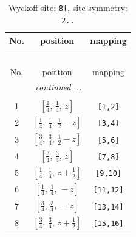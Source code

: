 \documentclass[fleqn,8pt]{jsarticle}
\begin{document}
\begin{longtable}{ccc}
\caption{Wyckoff site: {\tt 8f}, site symmetry: {\tt 2..}}
 \\
 \hline \hline
No. & position & mapping \\ \hline \endfirsthead

\multicolumn{2}{l}{\tablename\ \thetable{}} \\
 \hline \hline
No. & position & mapping \\ \hline \endhead

 \hline \hline
\multicolumn{2}{r}{\footnotesize\it continued ...} \\ \endfoot

 \hline \hline
\multicolumn{2}{r}{} \\ \endlastfoot

1 & $\left[ \frac{1}{4},\, \frac{1}{4},\, z \right]$ & {\tt [1,2]} \\ \hline
2 & $\left[ \frac{1}{4},\, \frac{1}{4},\, \frac{1}{2} - z \right]$ & {\tt [3,4]} \\ \hline
3 & $\left[ \frac{3}{4},\, \frac{3}{4},\, \frac{1}{2} - z \right]$ & {\tt [5,6]} \\ \hline
4 & $\left[ \frac{3}{4},\, \frac{3}{4},\, z \right]$ & {\tt [7,8]} \\ \hline
5 & $\left[ \frac{1}{4},\, \frac{1}{4},\, z + \frac{1}{2} \right]$ & {\tt [9,10]} \\ \hline
6 & $\left[ \frac{1}{4},\, \frac{1}{4},\, - z \right]$ & {\tt [11,12]} \\ \hline
7 & $\left[ \frac{3}{4},\, \frac{3}{4},\, - z \right]$ & {\tt [13,14]} \\ \hline
8 & $\left[ \frac{3}{4},\, \frac{3}{4},\, z + \frac{1}{2} \right]$ & {\tt [15,16]} \\
\end{longtable}
\renewcommand{\arraystretch}{1.2}
\end{document}

